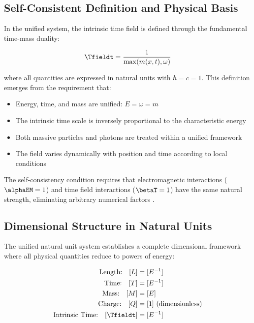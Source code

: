 	\subsection{Self-Consistent Definition and Physical Basis}
	\label{subsec:self_consistent_definition}
	
	In the unified system, the intrinsic time field is defined through the fundamental time-mass duality:
	
	\begin{equation}
		\Tfieldt = \frac{1}{\max(m(x,t), \omega)}
	\end{equation}
	
	where all quantities are expressed in natural units with $\hbar = c = 1$. This definition emerges from the requirement that:
	
	\begin{itemize}
		\item Energy, time, and mass are unified: $E = \omega = m$
		\item The intrinsic time scale is inversely proportional to the characteristic energy
		\item Both massive particles and photons are treated within a unified framework
		\item The field varies dynamically with position and time according to local conditions
	\end{itemize}
	
	The self-consistency condition requires that electromagnetic interactions ($\alphaEM = 1$) and time field interactions ($\betaT = 1$) have the same natural strength, eliminating arbitrary numerical factors \cite{pascher_beta_derivation_2025}.
	
	\subsection{Dimensional Structure in Natural Units}
	\label{subsec:dimensional_structure}
	
	The unified natural unit system establishes a complete dimensional framework where all physical quantities reduce to powers of energy:
	
	\begin{tcolorbox}[colback=blue!5!white,colframe=blue!75!black,title=Unified Natural Units Dimensional Structure]
		\begin{align}
			\text{Length:} \quad [L] &= [E^{-1}] \nonumber\\
			\text{Time:} \quad [T] &= [E^{-1}] \nonumber\\
			\text{Mass:} \quad [M] &= [E] \nonumber\\
			\text{Charge:} \quad [Q] &= [1] \text{ (dimensionless)} \nonumber\\
			\text{Intrinsic Time:} \quad [\Tfieldt] &= [E^{-1}] \nonumber
		\end{align}
	\end{tcolorbox}
	
